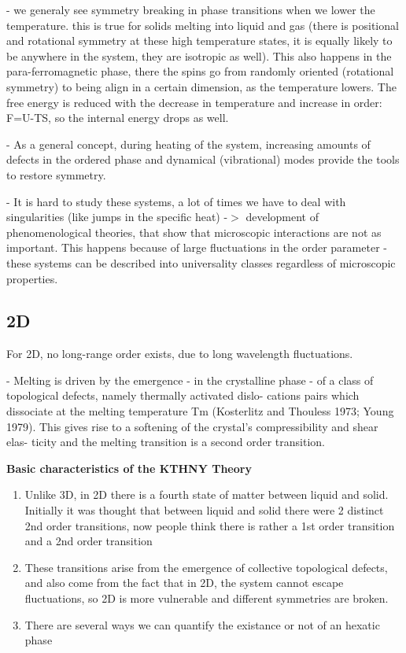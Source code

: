 \documentclass[a4paper]{article}
\begin{document}
- we generaly see symmetry breaking in phase transitions when we lower the temperature. this is true for solids melting into liquid and gas (there is positional and rotational symmetry at these high temperature states, it is equally likely to be anywhere in the system, they are isotropic as well). This also happens in the para-ferromagnetic phase, there the spins go from randomly oriented (rotational symmetry) to being align in a certain dimension, as the temperature lowers. The free energy is reduced with the decrease in temperature and increase in order: F=U-TS, so the internal energy drops as well.

-  As a general
concept, during heating of the system, increasing amounts of defects in the ordered phase and
dynamical (vibrational) modes provide the tools to restore symmetry.

- It is hard to study these systems, a lot of times we have to deal with singularities (like jumps in the specific heat) -$>$ development of phenomenological theories, that show that microscopic interactions are not as important. This happens because of large fluctuations in the order parameter - these systems can be described into universality classes regardless of microscopic properties.

\subsection{2D}

For 2D, no long-range order exists, due to long wavelength fluctuations. 

- Melting is driven by the emergence
- in the crystalline phase - of a class of topological defects, namely thermally activated dislo-
cations pairs which dissociate at the melting temperature Tm (Kosterlitz and Thouless 1973;
Young 1979). This gives rise to a softening of the crystal’s compressibility and shear elas-
ticity and the melting transition is a second order transition. 

\textbf{Basic characteristics of the KTHNY Theory}

\begin{enumerate}
	\item Unlike 3D, in 2D there is a fourth state of matter between liquid and solid. Initially it was thought that between liquid and solid there were 2 distinct 2nd order transitions, now people think there is rather a 1st order transition and a 2nd order transition
	\item These transitions arise from the emergence of collective topological defects, and also come from the fact that in 2D, the system cannot escape fluctuations, so 2D is more vulnerable and different symmetries are broken.
	\item There are several ways we can quantify the existance or not of an hexatic phase
\end{enumerate}
\end{document}
